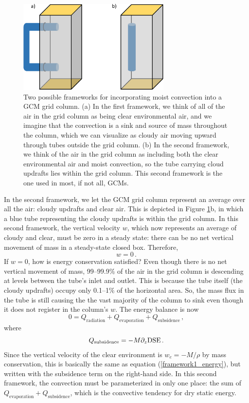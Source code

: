 \documentclass[12pt]{article}
\newcommand{\dse}{{\text{DSE}}}
\begin{document}
\begin{figure}
\begin{center}
\includegraphics[width=3in]{../figures/17leshouches_scm.pdf}
\caption{Two possible frameworks for incorporating moist convection into a GCM grid column.  (a) In the first framework, we think of all of the air in the grid column as being clear environmental air, and we imagine that the convection is a sink and source of mass throughout the column, which we can visualize as cloudy air moving upward through tubes outside the grid column.  (b) In the second framework, we think of the air in the grid column as including both the clear environmental air and moist convection, so the tube carrying cloud updrafts lies within the grid column.  This second framework is the one used in most, if not all, GCMs.}
\label{17leshouches_scm}
\end{center}
\end{figure}


In the second framework, we let the GCM grid column represent an average over all the air: cloudy updrafts and clear air.  This is depicted in Figure \ref{17leshouches_scm}b, in which a blue tube representing the cloudy updrafts is within the grid column.  In this second framework, the vertical velocity $w$, which now represents an average of cloudy and clear, must be zero in a steady state: there can be no net vertical movement of mass in a steady-state closed box.  Therefore,
\begin{equation}
w = 0 \, . \label{framework2_mass}
\end{equation}
If $w = 0$, how is energy conservation satisfied?  Even though there is no net vertical movement of mass, 99--99.9\% of the air in the grid column is descending at levels between the tube's inlet and outlet.  This is because the tube itself (the cloudy updrafts) occupy only 0.1--1\% of the horizontal area.  So, the mass flux in the tube is still causing the the vast majority of the column to sink even though it does not register in the column's $w$.  The energy balance is now
\begin{equation}
0 = Q_{\text{radiation}} + Q_{\text{evaporation}} + Q_{\text{subsidence}} \, , \label{framework2_energy}
\end{equation}
where
\[
Q_{\text{subsidence}} = -M \ppz \dse{} \, .
\]
Since the vertical velocity of the clear environment is $w_e = -M/\rho$ by mass conservation, this is basically the same as equation (\ref{framework1_energy}), but written with the subsidence term on the right-hand side.  In this second framework, the convection must be parameterized in only one place: the sum of $Q_{\text{evaporation}} + Q_{\text{subsidence}}$, which is the convective tendency for dry static energy.
\end{document}
